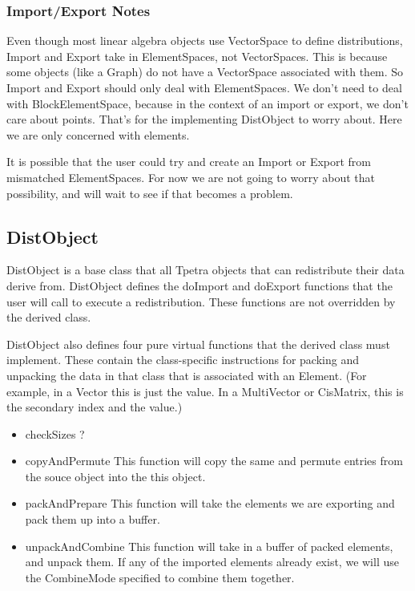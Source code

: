\documentclass[10pt,relax]{TpetraDesign}
\begin{document}
\subsubsection*{Import/Export Notes}
Even though most linear algebra objects use VectorSpace to define distributions, Import and Export take in ElementSpaces, not VectorSpaces. This is because some objects (like a Graph) do not have a VectorSpace associated with them. So Import and Export should only deal with ElementSpaces. We don't need to deal with BlockElementSpace, because in the context of an import or export, we don't care about points. That's for the implementing DistObject to worry about. Here we are only concerned with elements.

It is possible that the user could try and create an Import or Export from mismatched ElementSpaces. For now we are not going to worry about that possibility, and will wait to see if that becomes a problem.

\subsection{DistObject}

DistObject is a base class that all Tpetra objects that can redistribute their data derive from. DistObject defines the doImport and doExport functions that the user will call to execute a redistribution. These functions are not overridden by the derived class. 

DistObject also defines four pure virtual functions that the derived class must implement. These contain the class-specific instructions for packing and unpacking the data in that class that is associated with an Element. (For example, in a Vector this is just the value. In a MultiVector or CisMatrix, this is the secondary index and the value.)
\begin{itemize}
\item checkSizes ?
\item copyAndPermute This function will copy the same and permute entries from the souce object into the this object.
\item packAndPrepare This function will take the elements we are exporting and pack them up into a buffer.
\item unpackAndCombine This function will take in a buffer of packed elements, and unpack them. If any of the imported elements already exist, we will use the CombineMode specified to combine them together.
\end{itemize}
\end{document}
